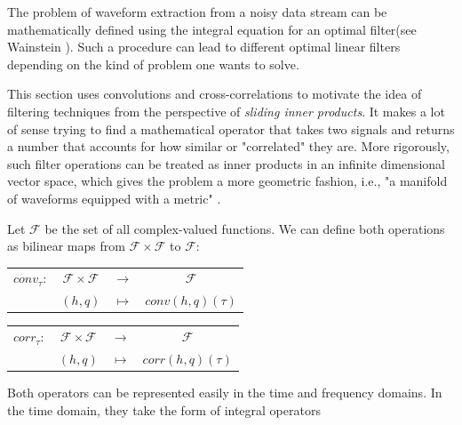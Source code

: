 The problem of waveform extraction from a noisy data stream can be mathematically defined using the integral equation for an optimal filter(see Wainstein \cite{Wainstein:1962vrq}). Such a procedure can lead to different optimal linear filters depending on the kind of problem one wants to solve. 

This section uses convolutions and cross-correlations to motivate the idea of filtering techniques from the perspective of \textit{sliding inner products}. It makes a lot of sense trying to find a mathematical operator that takes two signals and returns a number that accounts for how similar or "correlated" they are. More rigorously, such filter operations can be treated as inner products in an infinite dimensional vector space, which gives the problem a more geometric fashion, i.e., "a manifold of waveforms equipped with a metric" \cite{Andersson:2019yve,Creighton:2011zz}.

Let $\mathcal{F}$ be the set of all complex-valued functions. We can define both operations as bilinear maps from $\mathcal{F}\times\mathcal{F}$ to $\mathcal{F}$:

\vspace{1cm}

\begin{center}

\begin{tabular}{cccc}
$conv_\tau:$&$\mathcal{F}\times\mathcal{F}$ & $\rightarrow$ & $\mathcal{F}$ \\
&$(h, q)$ &$\mapsto$ & $conv(h,q)(\tau)$
\end{tabular}

\end{center}

\vspace{1cm}

\begin{center}

\begin{tabular}{cccc}
$corr_\tau:$&$\mathcal{F}\times\mathcal{F}$ & $\rightarrow$ & $\mathcal{F}$ \\
&$(h, q)$ &$\mapsto$ & $corr(h,q)(\tau)$
\end{tabular}

\end{center}

\vspace{1cm}

Both operators can be represented easily in the time and frequency domains. In the time domain, they take the form of integral operators 

